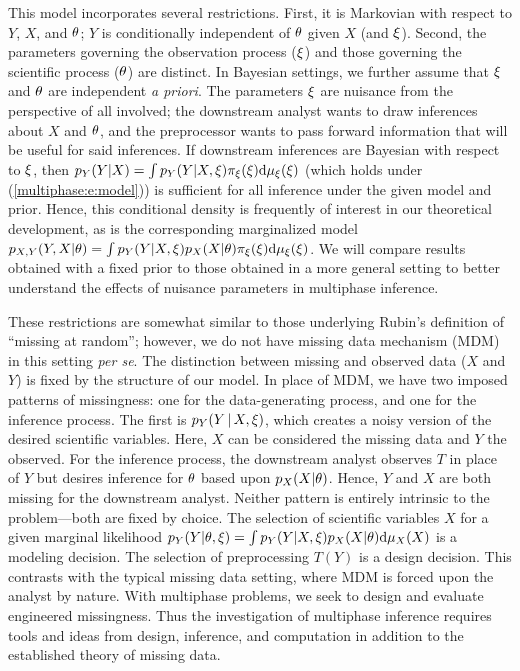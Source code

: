 This model incorporates   several restrictions.
First, it is Markovian with respect to $Y$, $X$, and $\theta$; $Y$ is conditionally independent of $\theta$ given $X$ (and $\xi$).
Second, the parameters governing the observation process ($\xi$) and those governing the scientific process  ($\theta$) are distinct.
In Bayesian settings, we further assume that $\xi$ and $\theta$ are independent \textit{a priori}.
The parameters $\xi$ are nuisance from the perspective of all involved; the downstream analyst wants to draw inferences about $X$ and $\theta$, and the preprocessor wants to pass forward information that will be useful for said inferences.
If downstream inferences are Bayesian with respect to $\xi$, then $p_Y(Y|X) = \int p_Y(Y | X, \xi) \pi_\xi(\xi)\mathrm{d}\mu_{\xi}(\xi)$ (which holds under (\ref{multiphase:e:model})) is sufficient for all inference under the given model and prior.
Hence, this conditional density is frequently of interest in our theoretical development, as is the corresponding marginalized model $p_{X,Y}(Y, X | \theta) = \int p_Y(Y | X, \xi)  p_X(X | \theta) \pi_\xi(\xi)\mathrm{d} \mu_{\xi}(\xi)$.
We will compare results obtained with a fixed prior to those obtained in a more general setting to better understand the effects of nuisance parameters in multiphase inference.

These restrictions are somewhat similar to those underlying Rubin's \citeyearpar{Rubin1976} definition of ``missing at random''; however, we do not have missing data mechanism (MDM) in this setting \emph{per se}.
The distinction between missing and observed data ($X$ and $Y$) is fixed by the structure of our model.
In place of MDM, we have two imposed patterns of missingness: one for the data-generating process, and one for the inference process.
The first is $p_Y(Y \, | \, X, \xi)$, which creates a noisy version of the desired scientific variables.
Here, $X$ can be considered the missing data and $Y$ the observed.
For the inference process, the downstream analyst observes $T$ in place of $Y$ but desires inference for $\theta$ based upon $p_X(X | \theta)$.
Hence, $Y$ and $X$ are both missing for the downstream analyst.
Neither pattern is entirely intrinsic to the problem---both are fixed by choice.
The selection of scientific variables $X$ for a given marginal likelihood $p_Y(Y | \theta, \xi) = \int p_Y(Y | X, \xi) p_X(X | \theta) \mathrm{d} \mu_{X}(X)$ is a modeling decision.
The selection of preprocessing $T(Y)$ is a design decision.
This contrasts with the typical missing data setting, where MDM is forced upon the analyst by nature.
With multiphase problems, we seek to design and evaluate engineered missingness.
Thus the investigation of multiphase inference requires tools and ideas from design, inference, and computation in addition to the established theory of missing data.

